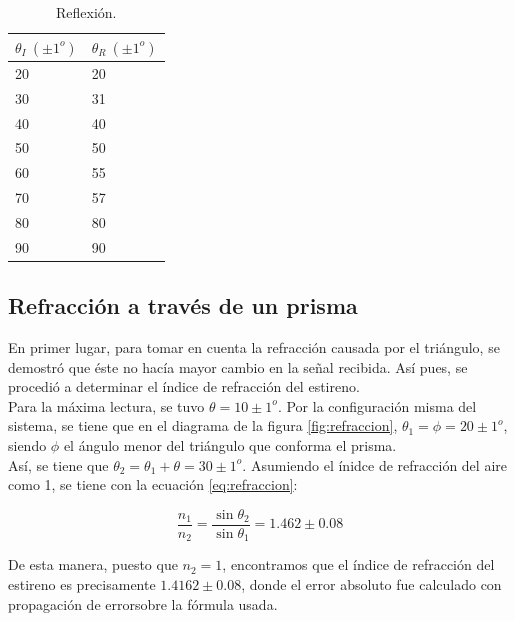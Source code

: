 \documentclass[prb,aps,twocolumn,preprintnumbers,amsmath,amssymb]{revtex4}
\begin{document}
\begin{table}[h!]
	\caption{\label{tabla1}Reflexión.}
	\begin{ruledtabular}
		\begin{tabular}{|M{3.5cm}|M{3.5cm}|}
			$\theta_I\ (\pm 1^o)$ & $\theta_R\ (\pm 1^o)$\\
			 & 20 \\
			30 & 31 \\
			40 & 40 \\
			50 & 50 \\
			60 & 55 \\
			70 & 57 \\
			80 & 80 \\
			90 & 90 \\
		\end{tabular}
	\end{ruledtabular}
\end{table}

\subsection{Refracción a través de un prisma} 

En primer lugar, para tomar en cuenta la refracción causada por el triángulo, se demostró que éste no hacía mayor cambio en la señal recibida. Así pues, se procedió a determinar el índice de refracción del estireno. \\

Para la máxima lectura, se tuvo $ \theta = 10 \pm 1^o $. Por la configuración misma del sistema, se tiene que en el diagrama de la figura \ref{fig:refraccion}, $ \theta_1 = \phi = 20\pm1^o $, siendo $ \phi $ el ángulo menor del triángulo que conforma el prisma. \\

Así, se tiene que $ \theta_2 = \theta_1 + \theta = 30\pm1^o $. Asumiendo el ínidce de refracción del aire como 1, se tiene con la ecuación \ref{eq:refraccion}:

\begin{equation}
\frac{n_1}{n_2} = \frac{\sin{\theta_2}}{\sin{\theta_1}}= 1.462\pm0.08
\end{equation}

De esta manera, puesto que $ n_2 = 1 $, encontramos que el índice de refracción del estireno es precisamente $1.4162\pm0.08$, donde el error absoluto fue calculado con propagación de error\footnotemark[3] sobre la fórmula usada. \\
\end{document}
